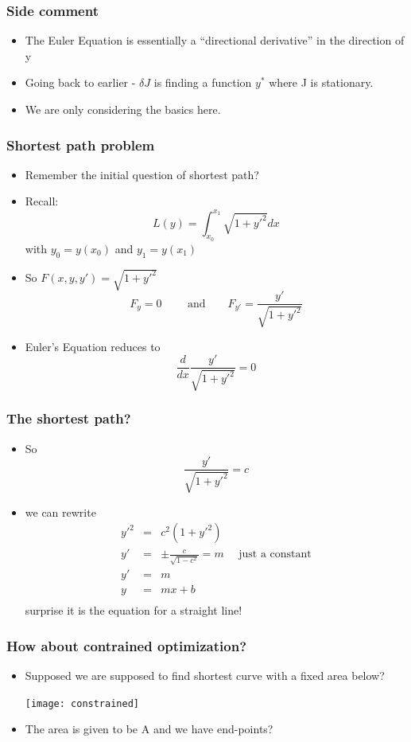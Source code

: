 \documentclass[10pt]{beamer}
\begin{document}
\begin{frame}
  \frametitle{Side comment}
  \begin{itemize}
  \item The Euler Equation is essentially a ``directional derivative''
    in the direction of y
  \item Going back to earlier - $\delta J$ is finding a function $y^*$
    where J is stationary. 
  \item We are only considering the basics here. 
  \end{itemize}
\end{frame}

\begin{frame}
  \frametitle{Shortest path problem}
  \begin{itemize}
  \item Remember the initial question of shortest path? 
  \item Recall:
    \[
      L(y) = \int_{x_0}^{x_1} \sqrt{1 + y'^2} dx
    \] with $y_0 = y(x_0)$ and $y_1 = y(x_1)$
  \item So $F(x, y, y') = \sqrt{1 + y'^2}$
    \[
      F_y = 0 \mbox{~~~~~~ and ~~~~~} F_{y'} = \frac{y'}{\sqrt{1+y'^2}}
    \]    
  \item Euler's Equation reduces to
    \[
      \frac{d}{dx} \frac{y'}{ \sqrt{1+y'^2} } = 0
    \]
  \end{itemize}
\end{frame}

\begin{frame}
  \frametitle{The shortest path?}
  \begin{itemize}
  \item So 
    \[
      \frac{ y' }{ \sqrt{1+y'^2} } = c
    \]
  \item we can rewrite
    \[
      \begin{array}{rcl}
        y'^2& = & c^2 (1+y'^2)\\ 
        y'  & = & \pm \frac{c}{\sqrt{1-c^2}} = m \mbox{ ~~ just a constant} \\ 
        y'  & = & m\\ 
        y   & = & mx + b \\ 
      \end{array}
    \]
    surprise it is the equation for a straight line!
    
  \end{itemize}
\end{frame}

\begin{frame}
  \frametitle{How about contrained optimization?}
  \begin{itemize}
  \item Supposed we are supposed to find shortest curve with a fixed area below?
    \centerline{\texttt{[image: constrained]}}
  \item The area is given to be A and we have end-points? 
  \end{itemize}
\end{frame}
\end{document}
